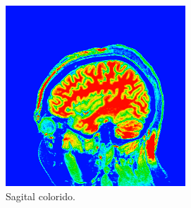 \documentclass{article}
\begin{document}
\begin{figure}[H]
\begin{subfigure}[b]{0.3\textwidth}
        \includegraphics[width=\textwidth]{brain/radiologist-sagital.png}
        \caption{Sagital colorido.}
    \end{subfigure}
    ~
    \begin{subfigure}[b]{0.3\textwidth}

\end{subfigure}
\end{figure}
\end{document}
